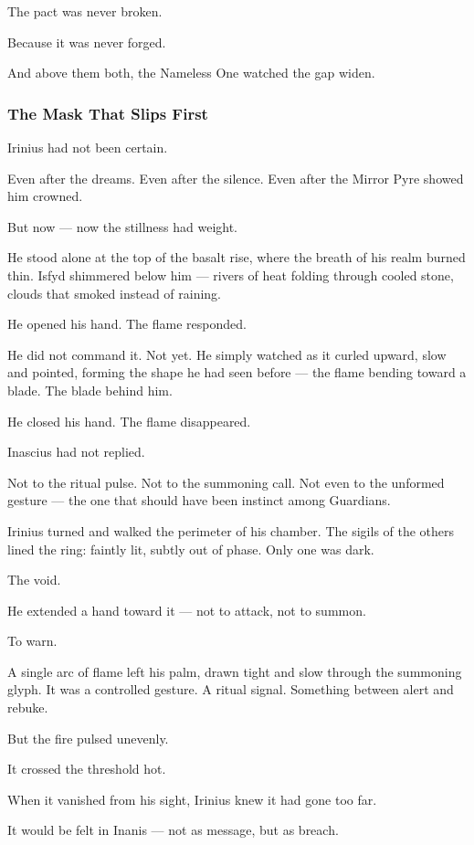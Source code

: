 \documentclass[12pt]{article}
\begin{document}
The pact was never broken.

Because it was never forged.

And above them both, the Nameless One watched the gap widen.


\dotfill

\subsubsection*{The Mask That Slips First}

Irinius had not been certain.

Even after the dreams. Even after the silence. Even after the Mirror Pyre showed him crowned.

But now — now the stillness had weight.

He stood alone at the top of the basalt rise, where the breath of his realm burned thin. Isfyd shimmered below him — rivers of heat folding through cooled stone, clouds that smoked instead of raining.

He opened his hand. The flame responded.

He did not command it. Not yet. He simply watched as it curled upward, slow and pointed, forming the shape he had seen before — the flame bending toward a blade. The blade behind him.

He closed his hand. The flame disappeared.

Inascius had not replied.

Not to the ritual pulse. Not to the summoning call. Not even to the unformed gesture — the one that should have been instinct among Guardians.

Irinius turned and walked the perimeter of his chamber. The sigils of the others lined the ring: faintly lit, subtly out of phase. Only one was dark.

The void.

He extended a hand toward it — not to attack, not to summon.

To warn.

A single arc of flame left his palm, drawn tight and slow through the summoning glyph. It was a controlled gesture. A ritual signal. Something between alert and rebuke.

But the fire pulsed unevenly.

It crossed the threshold hot.

When it vanished from his sight, Irinius knew it had gone too far.

It would be felt in Inanis — not as message, but as breach.
\end{document}
